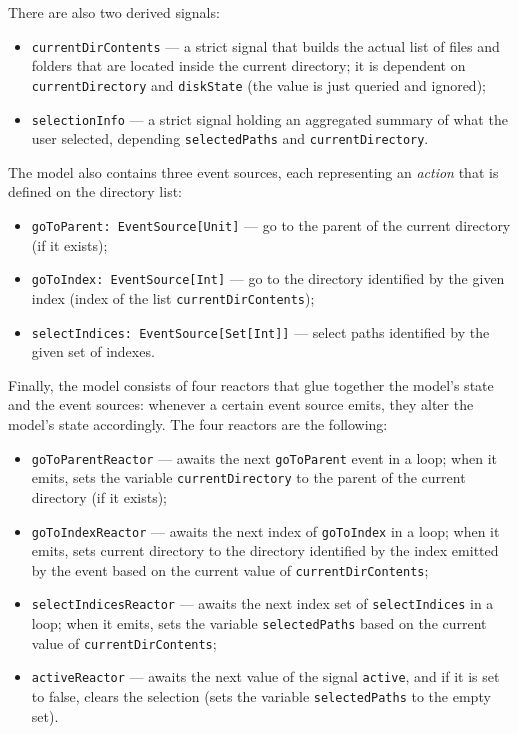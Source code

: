 There are also two derived signals:
\begin{itemize}

\item \texttt{currentDirContents} --- a strict signal that builds the actual list of files and folders that are located inside the current directory; it is dependent on \texttt{currentDirectory} and \texttt{diskState} (the value is just queried and ignored);

\item \texttt{selectionInfo} --- a strict signal holding an aggregated summary of what the user selected, depending \texttt{selectedPaths} and \texttt{currentDirectory}.
\end{itemize}

The model also contains three event sources, each representing an \emph{action} that is defined on the directory list:
\begin{itemize}
\item \texttt{goToParent: EventSource[Unit]} --- go to the parent of the current directory (if it exists);
\item \texttt{goToIndex: EventSource[Int]} --- go to the directory identified by the given index (index of the list \texttt{currentDirContents});
\item \texttt{selectIndices: EventSource[Set[Int]]} --- select paths identified by the given set of indexes.
\end{itemize}

Finally, the model consists of four reactors that glue together the model's state and the event sources: whenever a certain event source emits, they alter the model's state accordingly. The four reactors are the following:
\begin{itemize}
\item \texttt{goToParentReactor} --- awaits the next \texttt{goToParent} event in a loop; when it emits, sets the variable \texttt{currentDirectory} to the parent of the current directory (if it exists);
\item \texttt{goToIndexReactor} --- awaits the next index of \texttt{goToIndex} in a loop; when it emits, sets current directory to the directory identified by the index emitted by the event based on the current value of \texttt{currentDirContents};
\item \texttt{selectIndicesReactor} --- awaits the next index set of \texttt{selectIndices} in a loop; when it emits, sets the variable \texttt{selectedPaths} based on the current value of \texttt{currentDirContents};
\item \texttt{activeReactor} --- awaits the next value of the signal \texttt{active}, and if it is set to false, clears the selection (sets the variable \texttt{selectedPaths} to the empty set).
\end{itemize}

